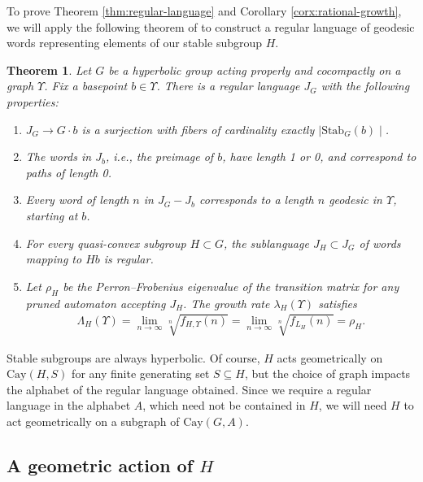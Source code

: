 \documentclass[10pt,a4paper]{amsart}
\newtheorem{theorem}{Theorem}[section]
\begin{document}
To prove Theorem \ref{thm:regular-language} and Corollary \ref{corx:rational-growth}, we will apply the following theorem of \cite{DFW} to construct a regular language of geodesic words representing elements of our stable subgroup $H$.


\begin{theorem}{\cite[Theorem~6.7]{DFW}}\label{thm:DFW-regular-lang}
        Let $G$ be a hyperbolic group acting properly and cocompactly on a graph $\Upsilon$. Fix a basepoint $b \in \Upsilon$. There is a regular language $J_G$ with the following properties:
        \begin{enumerate}
            \item $J_G \rightarrow G \cdot b$ is a surjection with fibers of cardinality exactly $\mid \text{Stab}_G(b)\mid$.
            \item The words in $J_b$, i.e., the preimage of $b$, have length 1 or 0, and correspond to paths of length 0.
            \item Every word of length $n$ in $J_G - J_b$ corresponds to a length $n$ geodesic in $\Upsilon$, starting at $b$.
            \item For every quasi-convex subgroup $H\subset G$, the sublanguage $J_H \subset J_G$ of words mapping to $Hb$ is regular.
            \item Let $\rho_H$ be the Perron--Frobenius eigenvalue of the transition matrix for any pruned automaton accepting $J_H$. The growth rate $\lambda_H(\Upsilon)$ satisfies 
            \begin{align*}
                \Lambda_H(\Upsilon) = \lim_{n \rightarrow \infty} \sqrt[n]{f_{H,\Upsilon}(n)} =  \lim_{n \rightarrow \infty} \sqrt[n]{f_{L_H}(n)} = \rho_H \text{.}
            \end{align*}
        \end{enumerate}
    \end{theorem}


Stable subgroups are always hyperbolic. Of course, $H$ acts geometrically on $\text{Cay}(H,S)$ for any finite generating set $S \subseteq H$, but the choice of graph impacts the alphabet of the regular language obtained. Since we require a regular language in the alphabet $A$, which need not be contained in $H$, we will need $H$ to act geometrically on a subgraph of $\text{Cay}(G,A)$.

\subsection{A geometric action of $H$}\label{subsec:geom-action-of-H}
\end{document}
